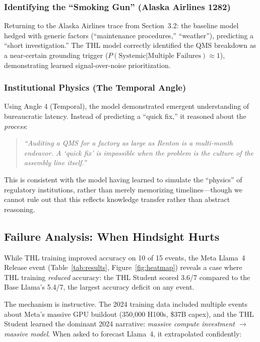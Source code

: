 \documentclass[11pt,a4paper]{article}
\begin{document}
\subsubsection*{Identifying the ``Smoking Gun'' (Alaska Airlines 1282)}
Returning to the Alaska Airlines trace from Section~3.2: the baseline model hedged with generic factors (``maintenance procedures,'' ``weather''), predicting a ``short investigation.'' The THL model correctly identified the QMS breakdown as a near-certain grounding trigger ($P(\text{Systemic} | \text{Multiple Failures}) \approx 1$), demonstrating learned signal-over-noise prioritization.

\subsubsection*{Institutional Physics (The Temporal Angle)}
Using Angle 4 (Temporal), the model demonstrated emergent understanding of bureaucratic latency. Instead of predicting a ``quick fix,'' it reasoned about the \textit{process}:
\begin{quote}
    \textit{``Auditing a QMS for a factory as large as Renton is a multi-month endeavor. A `quick fix' is impossible when the problem is the culture of the assembly line itself.''}
\end{quote}
This is consistent with the model having learned to simulate the ``physics'' of regulatory institutions, rather than merely memorizing timelines---though we cannot rule out that this reflects knowledge transfer rather than abstract reasoning.

\subsection{Failure Analysis: When Hindsight Hurts}
\label{sec:failure_analysis}

While THL training improved accuracy on 10 of 15 events, the Meta Llama~4 Release event (Table~\ref{tab:results}, Figure~\ref{fig:heatmap}) reveals a case where THL training \textit{reduced} accuracy: the THL Student scored 3.6/7 compared to the Base Llama's 5.4/7, the largest accuracy deficit on any event.

The mechanism is instructive. The 2024 training data included multiple events about Meta's massive GPU buildout (350,000 H100s, \$37B capex), and the THL Student learned the dominant 2024 narrative: \textit{massive compute investment $\to$ massive model}. When asked to forecast Llama~4, it extrapolated confidently:
\end{document}
